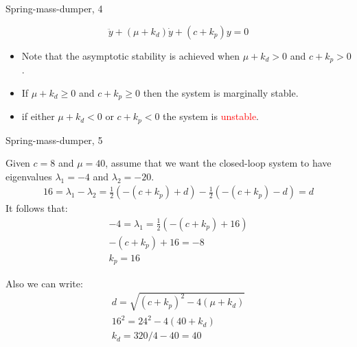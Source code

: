\documentclass{beamer}
\begin{document}
\begin{frame}{Spring-mass-dumper, 4}
	\begin{flushleft}
		
		
		\begin{equation}
			\ddot y + (\mu + k_d) \dot y + (c+k_p) y = 0
		\end{equation}
		
		\begin{itemize}
			\item 
			Note that the \textcolor{mydarkgreen}{asymptotic stability} is achieved when $\mu + k_d > 0$ and $c+k_p > 0$.
			
			\item 
			If $\mu + k_d \geq 0$ and $c+k_p \geq 0$ then the system is \textcolor{myblue}{marginally stable}.
			
			\item 
			if either $\mu + k_d < 0$ or $c+k_p < 0$ the system is \textcolor{red}{unstable}.
		\end{itemize}
		
		
	\end{flushleft}
\end{frame}



\begin{frame}{Spring-mass-dumper, 5}
	\begin{flushleft}
		
		Given $c = 8$ and $\mu = 40$, assume that we want the closed-loop system to have eigenvalues $\lambda_1 = -4$ and $\lambda_2 = -20$.
		\begin{align}
			16 = \lambda_1 - \lambda_2= \frac{1}{2} ( - (c+k_p) + d ) -  \frac{1}{2} ( - (c+k_p) - d ) = d
		\end{align}
		It follows that:
		\begin{align}
			-4 = \lambda_1 = \frac{1}{2} ( - (c+k_p) + 16)
			\\
			- (c+k_p) + 16 = -8
			\\
			k_p  = 16
		\end{align}
		
		
		Also we can write:
		\begin{align}
			d = \sqrt{(c+k_p)^2 - 4 (\mu + k_d)}
			\\
			16^2 = 24^2 - 4 (40 + k_d)
			\\
			k_d = 320 / 4 - 40 = 40
		\end{align}
		
		
	\end{flushleft}
\end{frame}
\end{document}
